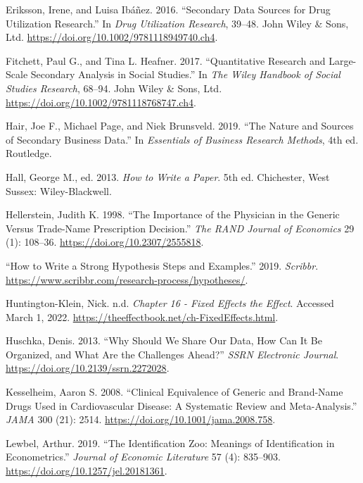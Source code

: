 \documentclass[
]{book}
\begin{document}
\leavevmode\hypertarget{ref-eriksson_secondary_2016}{}%
Eriksson, Irene, and Luisa Ibáñez. 2016. ``Secondary Data Sources for
Drug Utilization Research.'' In \emph{Drug Utilization Research},
39--48. John Wiley \& Sons, Ltd.
\url{https://doi.org/10.1002/9781118949740.ch4}.

\leavevmode\hypertarget{ref-fitchett_quantitative_2017}{}%
Fitchett, Paul G., and Tina L. Heafner. 2017. ``Quantitative Research
and Large-Scale Secondary Analysis in Social Studies.'' In \emph{The
Wiley Handbook of Social Studies Research}, 68--94. John Wiley \& Sons,
Ltd. \url{https://doi.org/10.1002/9781118768747.ch4}.

\leavevmode\hypertarget{ref-hair_nature_2019}{}%
Hair, Joe F., Michael Page, and Niek Brunsveld. 2019. ``The Nature and
Sources of Secondary Business Data.'' In \emph{Essentials of Business
Research Methods}, 4th ed. Routledge.

\leavevmode\hypertarget{ref-hall_how_2013}{}%
Hall, George M., ed. 2013. \emph{How to Write a Paper}. 5th ed.
Chichester, West Sussex: Wiley-Blackwell.

\leavevmode\hypertarget{ref-hellerstein_importance_1998}{}%
Hellerstein, Judith K. 1998. ``The Importance of the Physician in the
Generic Versus Trade-Name Prescription Decision.'' \emph{The RAND
Journal of Economics} 29 (1): 108--36.
\url{https://doi.org/10.2307/2555818}.

\leavevmode\hypertarget{ref-noauthor_how_2019}{}%
``How to Write a Strong Hypothesis Steps and Examples.'' 2019.
\emph{Scribbr}.
\url{https://www.scribbr.com/research-process/hypotheses/}.

\leavevmode\hypertarget{ref-huntington-klein_chapter_nodate}{}%
Huntington-Klein, Nick. n.d. \emph{Chapter 16 - Fixed Effects the
Effect}. Accessed March 1, 2022.
\url{https://theeffectbook.net/ch-FixedEffects.html}.

\leavevmode\hypertarget{ref-huschka_why_2013}{}%
Huschka, Denis. 2013. ``Why Should We Share Our Data, How Can It Be
Organized, and What Are the Challenges Ahead?'' \emph{SSRN Electronic
Journal}. \url{https://doi.org/10.2139/ssrn.2272028}.

\leavevmode\hypertarget{ref-kesselheim_clinical_2008}{}%
Kesselheim, Aaron S. 2008. ``Clinical Equivalence of Generic and
Brand-Name Drugs Used in Cardiovascular Disease: A Systematic Review and
Meta-Analysis.'' \emph{JAMA} 300 (21): 2514.
\url{https://doi.org/10.1001/jama.2008.758}.

\leavevmode\hypertarget{ref-lewbel_identification_2019}{}%
Lewbel, Arthur. 2019. ``The Identification Zoo: Meanings of
Identification in Econometrics.'' \emph{Journal of Economic Literature}
57 (4): 835--903. \url{https://doi.org/10.1257/jel.20181361}.
\end{document}
